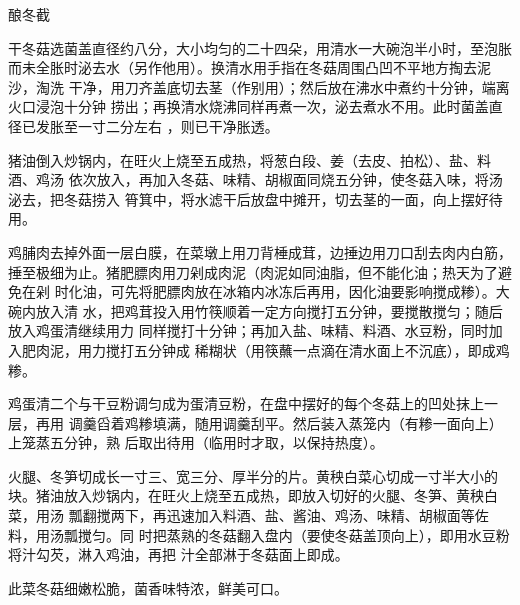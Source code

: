 \begin{recipe}{酿冬截}

\ingredients


\preparation

\step 干冬菇选菌盖直径约八分，大小均匀的二十四朵，用清水一大碗泡半小时，至泡胀
而未全胀时泌去水（另作他用）。换清水用手指在冬菇周围凸凹不平地方掏去泥沙，淘洗
干净，用刀齐盖底切去茎（作别用）；然后放在沸水中煮约十分钟，端离火口浸泡十分钟
捞出；再换清水烧沸同样再煮一次，泌去煮水不用。此时菌盖直径已发胀至一寸二分左右
，则已干净胀透。

猪油倒入炒锅内，在旺火上烧至五成热，将葱白段、姜（去皮、拍松）、盐、料酒、鸡汤
依次放入，再加入冬菇、味精、胡椒面同烧五分钟，使冬菇入味，将汤泌去，把冬菇捞入
筲箕中，将水滤干后放盘中摊开，切去茎的一面，向上摆好待用。

\step 鸡脯肉去掉外面一层白膜，在菜墩上用刀背棰成茸，边捶边用刀口刮去肉内白筋，
捶至极细为止。猪肥膘肉用刀剁成肉泥（肉泥如同油脂，但不能化油；热天为了避免在剁
时化油，可先将肥膘肉放在冰箱内冰冻后再用，因化油要影响搅成糁）。大碗内放入清
水，把鸡茸投入用竹筷顺着一定方向搅打五分钟，要搅散搅匀；随后放入鸡蛋清继续用力
同样搅打十分钟；再加入盐、味精、料酒、水豆粉，同时加入肥肉泥，用力搅打五分钟成
稀糊状（用筷蘸一点滴在清水面上不沉底），即成鸡糁。

鸡蛋清二个与干豆粉调匀成为蛋清豆粉，在盘中摆好的每个冬菇上的凹处抹上一层，再用
调羹舀着鸡糁填满，随用调羹刮平。然后装入蒸笼内（有糁一面向上）上笼蒸五分钟，熟
后取出待用（临用时才取，以保持热度）。

\step 火腿、冬笋切成长一寸三、宽三分、厚半分的片。黄秧白菜心切成一寸半大小的
块。猪油放入炒锅内，在旺火上烧至五成热，即放入切好的火腿、冬笋、黄秧白菜，用汤
瓢翻搅两下，再迅速加入料酒、盐、酱油、鸡汤、味精、胡椒面等佐料，用汤瓢搅匀。同
时把蒸熟的冬菇翻入盘内（要使冬菇盖顶向上），即用水豆粉将汁勾芡，淋入鸡油，再把
汁全部淋于冬菇面上即成。

\features

此菜冬菇细嫩松脆，菌香味特浓，鲜美可口。

\end{recipe}

